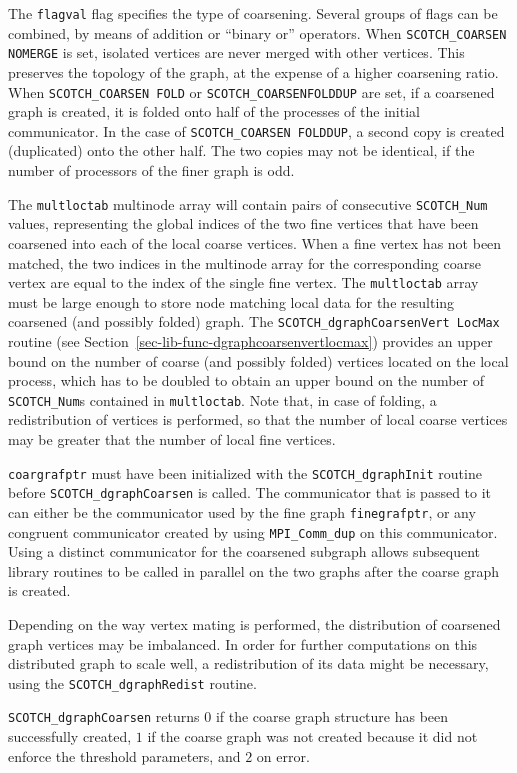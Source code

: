 \begin{itemize}
The {\tt flagval} flag specifies the type of coarsening. Several
groups of flags can be combined, by means of addition or
``binary or'' operators. When {\tt SCOTCH\_\lbt COARSEN\lbt
NO\lbt MERGE} is set, isolated vertices are never merged with other
vertices. This preserves the topology of the graph, at the expense of
a higher coarsening ratio. When {\tt SCOTCH\_\lbt COARSEN\lbt
FOLD} or {\tt SCOTCH\_\lbt COARSEN\lbt FOLD\lbt DUP} are set, if a
coarsened graph is created, it is folded onto half of the processes of
the initial communicator. In the case of {\tt SCOTCH\_\lbt COARSEN\lbt
FOLD\lbt DUP}, a second copy is created (duplicated) onto the other
half. The two copies may not be identical, if the number of processors
of the finer graph is odd.

The \texttt{multloctab} multinode array will contain pairs of
consecutive \texttt{SCOTCH\_\lbt Num} values, representing the global
indices of the two fine vertices that have been coarsened into each of
the local coarse vertices. When a fine vertex has not been matched,
the two indices in the multinode array for the corresponding coarse
vertex are equal to the index of the single fine vertex.
The \texttt{multloctab} array must be large enough to store node
matching local data for the resulting coarsened (and possibly folded)
graph. The \texttt{SCOTCH\_\lbt dgraph\lbt Coarsen\lbt Vert\lbt
Loc\lbt Max} routine (see
Section~\ref{sec-lib-func-dgraphcoarsenvertlocmax}) provides an
upper bound on the number of coarse (and possibly folded) vertices
located on the local process, which has to be doubled to obtain an
upper bound on the number of \texttt{SCOTCH\_\lbt Num}s contained in
\texttt{multloctab}. Note that, in case of folding, a redistribution
of vertices is performed, so that the number of local coarse vertices
may be greater that the number of local fine vertices.

{\tt coargrafptr} must have been initialized with the
{\tt SCOTCH\_\lbt dgraph\lbt Init} routine before
{\tt SCOTCH\_dgraph\lbt Coarsen} is called. The communicator that is
passed to it can either be the communicator used by the fine graph
{\tt fine\lbt graf\lbt ptr}, or any congruent communicator created by
using {\tt MPI\_\lbt Comm\_\lbt dup} on this communicator. Using a
distinct communicator for the coarsened subgraph allows subsequent
library routines to be called in parallel on the two graphs after the
coarse graph is created.

Depending on the way vertex mating is performed, the distribution of
coarsened graph vertices may be imbalanced. In order for further
computations on this distributed graph to scale well, a redistribution
of its data might be necessary, using the
{\tt SCOTCH\_dgraph\lbt Redist} routine.

\progret

{\tt SCOTCH\_dgraphCoarsen} returns $0$ if the coarse graph
structure has been successfully created, $1$ if the coarse graph was
not created because it did not enforce the threshold parameters, and
$2$ on error.
\end{itemize}

